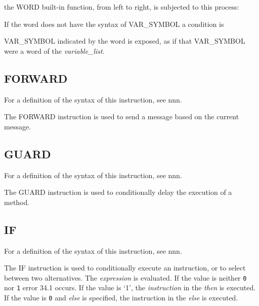
the WORD built-in function, from left to right, is subjected to this
process:

If the word does not have the syntax of VAR\_SYMBOL a condition is

VAR\_SYMBOL indicated by the word is exposed, as if that VAR\_SYMBOL
were a word of the \emph{variable\_list}.

\subsection{FORWARD}\label{forward}

For a definition of the syntax of this instruction, see nnn.

The FORWARD instruction is used to send a message based on the current
message.



\subsection{GUARD}\label{guard}

For a definition of the syntax of this instruction, see nnn.

The GUARD instruction is used to conditionally delay the execution of a
method.




\subsection{IF}\label{if}

For a definition of the syntax of this instruction, see nnn.

The IF instruction is used to conditionally execute an instruction, or
to select between two alternatives. The \emph{expression} is evaluated.
If the value is neither \texttt{\textquotesingle{}0\textquotesingle{}}
nor \texttt{\textquotesingle{}1\textquotesingle{}} error 34.1 occurs. If
the value is `1', the \emph{instruction} in the \emph{then} is executed.
If the value is \texttt{\textquotesingle{}0\textquotesingle{}} and
\emph{else} is specified, the instruction in the \emph{else} is
executed.

